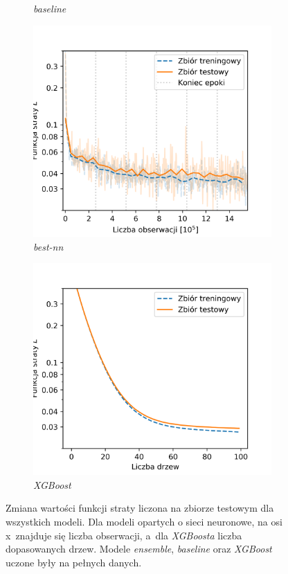 \documentclass{pracalicmgr}
\begin{document}
\begin{figure}
\begin{subfigure}{.5\textwidth}
	\caption{\textit{baseline}}
	\end{subfigure}
	\begin{subfigure}{.5\textwidth}
	\centering
	\includegraphics[width=1\textwidth]{loss_best-nn.png}
	\caption{\textit{best-nn}}
	\end{subfigure}
	\begin{subfigure}{.5\textwidth}
	\centering
	\includegraphics[width=1\textwidth]{loss_xgb.png}
	\caption{\textit{XGBoost}}
	\end{subfigure}
	\caption{Zmiana wartości funkcji straty liczona na zbiorze testowym dla wszystkich modeli. Dla modeli opartych o sieci neuronowe, na osi x~znajduje się liczba obserwacji, a~dla \textit{XGBoosta} liczba dopasowanych drzew. Modele \textit{ensemble}, \textit{baseline} oraz \textit{XGBoost} uczone były na pełnych danych.}
	\label{fig:loss}
	\end{figure}	
	
\end{document}
